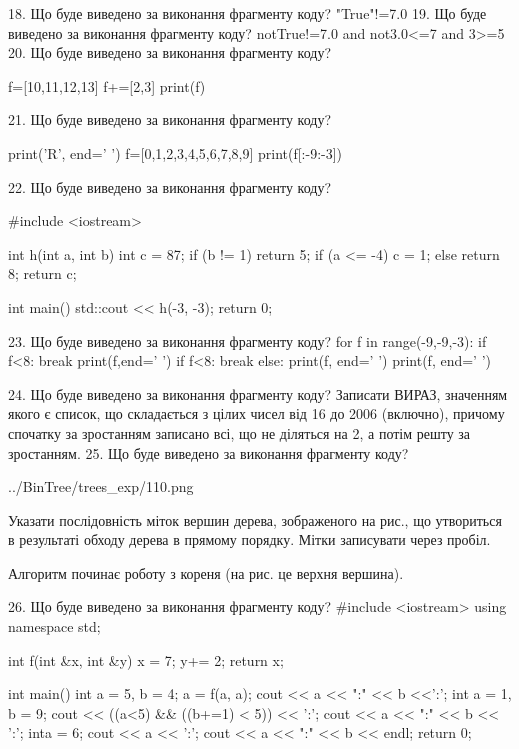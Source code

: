 \documentclass[11pt]{article}
\begin{document}
18. Що буде виведено за виконання фрагменту коду?
"True"!=7.0
19. Що буде виведено за виконання фрагменту коду?
notTrue!=7.0 and not3.0<=7 and 3>=5
20. Що буде виведено за виконання фрагменту коду?

f=[10,11,12,13]
f+=[2,3]
print(f)


21. Що буде виведено за виконання фрагменту коду?

print('R', end=' ')
f=[0,1,2,3,4,5,6,7,8,9]
print(f[:-9:-3])


22. Що буде виведено за виконання фрагменту коду?

#include <iostream>

int h(int a, int b){
    int c = 87;
    if (b != 1)
        return 5;
    if (a <= -4)
         c = 1;
    else 
        return 8;
    return c;
}

int main(){
    std::cout << h(-3, -3);
    return 0;
}

23. Що буде виведено за виконання фрагменту коду?
for f in range(-9,-9,-3):
    if f<8:
        break
        print(f,end=' ')
    if f<8:
        break
else:
    print(f, end=' ')
print(f, end=' ')

24. Що буде виведено за виконання фрагменту коду?
Записати ВИРАЗ, значенням якого є список, що складається з цілих чисел від 16 до 2006 (включно), причому спочатку за зростанням записано всі, що не діляться на 2, а потім решту за зростанням.
25. Що буде виведено за виконання фрагменту коду?

\begin{center}
	{../BinTree/trees_exp/110.png}
\end{center}
Указати послідовність міток вершин дерева, зображеного на рис., що утвориться в результаті обходу дерева в прямому порядку. Мітки записувати через пробіл.\par Алгоритм починає роботу з кореня (на рис. це верхня вершина).

26. Що буде виведено за виконання фрагменту коду?
#include <iostream>
using namespace std;

int f(int &x, int &y){
    x = 7;
    y+= 2;
    return x;
}

int main(){
    int a = 5, b = 4;
    a = f(a, a);
    cout << a << ":" << b <<':';
    {
        int a = 1, b = 9;
        cout << ((a<5) && ((b+=1) < 5)) << ':';
        cout << a << ":" << b << ':';
    }
    {
        inta = 6;
        cout << a << ':';
    }
    cout << a << ":" << b << endl;
    return 0;
}
\end{document}
